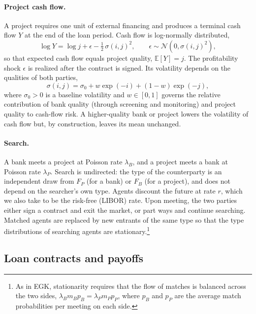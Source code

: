 \documentclass[12pt]{article}
\newcommand{\E}{\mathbb{E}}
\begin{document}
\paragraph{Project cash flow.}
A project requires one unit of external financing and produces a terminal
cash flow $Y$ at the end of the loan period. Cash flow is log-normally
distributed,
\begin{equation}
  \log Y = \log j + \epsilon - \tfrac{1}{2}\,\sigma(i,j)^2,
  \qquad \epsilon \sim \mathcal{N}\!\left(0, \sigma(i,j)^2\right),
  \label{eq:cashflow}
\end{equation}
so that expected cash flow equals project quality, $\E[Y] = j$. The
profitability shock $\epsilon$ is realized after the contract is signed. Its
volatility depends on the qualities of both parties,
\begin{equation}
  \sigma(i,j) = \sigma_0 + w \exp(-i) + (1-w) \exp(-j),
  \label{eq:sigma}
\end{equation}
where $\sigma_0 > 0$ is a baseline volatility and $w \in [0,1]$ governs the
relative contribution of bank quality (through screening and monitoring) and
project quality to cash-flow risk. A higher-quality bank or project lowers
the volatility of cash flow but, by construction, leaves its mean unchanged.

\paragraph{Search.}
A bank meets a project at Poisson rate $\lambda_B$, and a project meets a bank
at Poisson rate $\lambda_P$. Search is undirected: the type of the
counterparty is an independent draw from $F_P$ (for a bank) or $F_B$ (for a
project), and does not depend on the searcher's own type. Agents discount the
future at rate $r$, which we also take to be the risk-free (LIBOR) rate. Upon
meeting, the two parties either sign a contract and exit the market, or part
ways and continue searching. Matched agents are replaced by new entrants of
the same type so that the type distributions of searching agents are
stationary.\footnote{As in EGK, stationarity requires that the flow of
matches is balanced across the two sides, $\lambda_B m_B p_B = \lambda_P m_P
p_P$, where $p_B$ and $p_P$ are the average match probabilities per meeting
on each side.}

\subsection{Loan contracts and payoffs}
\label{sec:contracts}
\end{document}
